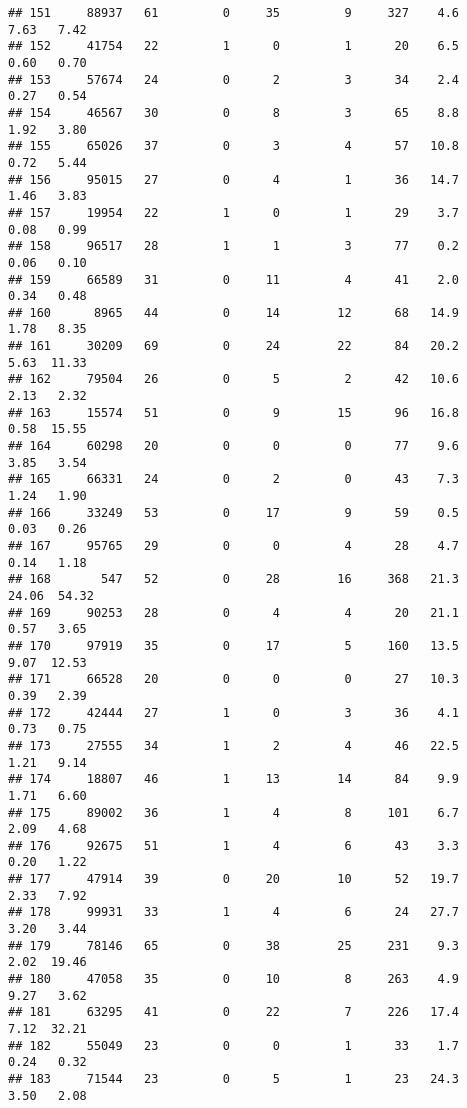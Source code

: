 \documentclass[
]{article}
\begin{document}
\begin{verbatim}
## 151     88937   61         0     35         9     327    4.6    7.63   7.42
## 152     41754   22         1      0         1      20    6.5    0.60   0.70
## 153     57674   24         0      2         3      34    2.4    0.27   0.54
## 154     46567   30         0      8         3      65    8.8    1.92   3.80
## 155     65026   37         0      3         4      57   10.8    0.72   5.44
## 156     95015   27         0      4         1      36   14.7    1.46   3.83
## 157     19954   22         1      0         1      29    3.7    0.08   0.99
## 158     96517   28         1      1         3      77    0.2    0.06   0.10
## 159     66589   31         0     11         4      41    2.0    0.34   0.48
## 160      8965   44         0     14        12      68   14.9    1.78   8.35
## 161     30209   69         0     24        22      84   20.2    5.63  11.33
## 162     79504   26         0      5         2      42   10.6    2.13   2.32
## 163     15574   51         0      9        15      96   16.8    0.58  15.55
## 164     60298   20         0      0         0      77    9.6    3.85   3.54
## 165     66331   24         0      2         0      43    7.3    1.24   1.90
## 166     33249   53         0     17         9      59    0.5    0.03   0.26
## 167     95765   29         0      0         4      28    4.7    0.14   1.18
## 168       547   52         0     28        16     368   21.3   24.06  54.32
## 169     90253   28         0      4         4      20   21.1    0.57   3.65
## 170     97919   35         0     17         5     160   13.5    9.07  12.53
## 171     66528   20         0      0         0      27   10.3    0.39   2.39
## 172     42444   27         1      0         3      36    4.1    0.73   0.75
## 173     27555   34         1      2         4      46   22.5    1.21   9.14
## 174     18807   46         1     13        14      84    9.9    1.71   6.60
## 175     89002   36         1      4         8     101    6.7    2.09   4.68
## 176     92675   51         1      4         6      43    3.3    0.20   1.22
## 177     47914   39         0     20        10      52   19.7    2.33   7.92
## 178     99931   33         1      4         6      24   27.7    3.20   3.44
## 179     78146   65         0     38        25     231    9.3    2.02  19.46
## 180     47058   35         0     10         8     263    4.9    9.27   3.62
## 181     63295   41         0     22         7     226   17.4    7.12  32.21
## 182     55049   23         0      0         1      33    1.7    0.24   0.32
## 183     71544   23         0      5         1      23   24.3    3.50   2.08

\end{verbatim}
\end{document}
